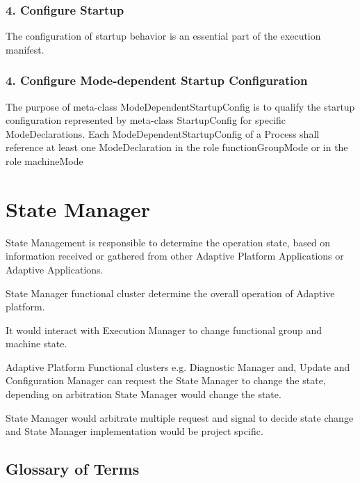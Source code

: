 \subsubsection*{4. Configure Startup}

The configuration of startup behavior is an essential part of the execution manifest.

\subsubsection*{4. Configure Mode-\/dependent Startup Configuration}

The purpose of meta-\/class Mode\+Dependent\+Startup\+Config is to qualify the startup configuration represented by meta-\/class Startup\+Config for specific Mode\+Declarations. Each Mode\+Dependent\+Startup\+Config of a Process shall reference at least one Mode\+Declaration in the role function\+Group\+Mode or in the role machine\+Mode \hypertarget{adaptive_state_manager}{}\section{State Manager}\label{adaptive_state_manager}

\begin{DoxyItemize}
\item State Management is responsible to determine the operation state, based on information received or gathered from other Adaptive Platform Applications or Adaptive Applications.
\item State Manager functional cluster determine the overall operation of Adaptive platform.
\item It would interact with Execution Manager to change functional group and machine state.
\item Adaptive Platform Functional clusters e.\+g. Diagnostic Manager and, Update and Configuration Manager can request the State Manager to change the state, depending on arbitration State Manager would change the state.
\item State Manager would arbitrate multiple request and signal to decide state change and State Manager implementation would be project spcific.
\end{DoxyItemize}

\subsection*{Glossary of Terms}

